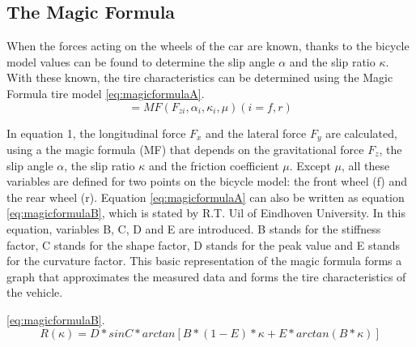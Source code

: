 \subsection{The Magic Formula}	
When the forces acting on the wheels of the car are known, thanks to the bicycle model values can be found to determine the slip angle \(\alpha\) and the slip ratio \(\kappa\). With these known, the tire characteristics can be determined using the Magic Formula tire model
 \ref{eq:magicformulaA}. 
\begin{equation}
	[F_{xwi} ,F_{ywi}] = MF(F_{zi},\alpha_{i},\kappa_{i},\mu) (i = f,r)
	\label{eq:magicformulaA} 
\end{equation}

In equation 1, the longitudinal force \(F_{x}\) and the lateral force \(F_{y}\) are calculated, using a the magic formula (MF) that depends on the gravitational force \(F_{z}\), the slip angle \(\alpha\), the slip ratio \(\kappa\) and the friction coefficient \(\mu\). Except \(\mu\), all these variables are defined for two points on the bicycle model: the front wheel (f) and the rear wheel (r). 
	Equation \ref{eq:magicformulaA} can also be written as equation \ref{eq:magicformulaB}, which is stated by R.T. Uil of Eindhoven University. In this equation, variables B, C, D and E are introduced. B stands for the stiffness factor, C stands for the shape factor, D stands for the peak value and E stands for the curvature factor. This basic representation of the magic formula forms a graph that approximates the measured data and forms the tire characteristics of the vehicle. 

 \ref{eq:magicformulaB}. 
\begin{equation}
	R(\kappa) = D*sin{C*arctan[B*(1-E)*\kappa+E*arctan(B*\kappa)]}
	\label{eq:magicformulaB} 
\end{equation}
